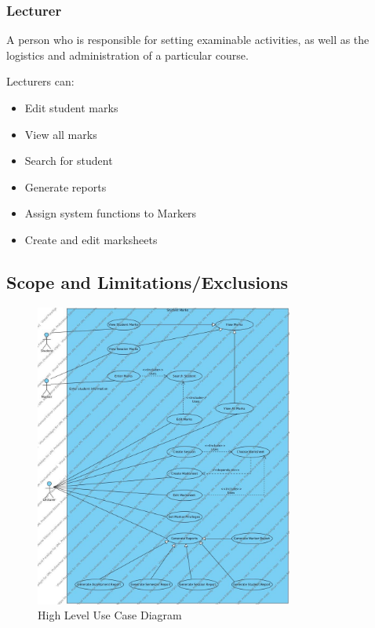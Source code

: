 \documentclass[a4paper]{article}
\begin{document}
			\subsubsection{Lecturer}
				\begin{flushleft}
				A person who is responsible for setting examinable activities, as well as the logistics and administration of a particular course. \linebreak 
				
				Lecturers can:
				\end{flushleft}
				\begin{itemize}

					\item{Edit student marks}
					
					\item{View all marks}
					
					\item{Search for student}
					
					\item{Generate reports}
					
					\item{Assign system functions to Markers}
					
					\item{Create and edit marksheets}

				\end{itemize}
			
			\subsection{Scope and Limitations/Exclusions}
			\begin{figure}[h]
				\caption{High Level Use Case Diagram}
				\includegraphics[height=10cm]{StudentMarks}
			\end{figure}
\end{document}
